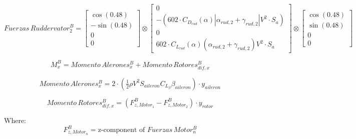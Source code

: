 \documentclass{article}
\begin{document}
\[
  Fuerzas\,Ruddervator_2^B = \begin{bmatrix}
                               \cos(0.48)  \\[6pt]
                               -\sin(0.48) \\[6pt]
                               0           \\[6pt]
                               0
                             \end{bmatrix}
  \otimes \begin{bmatrix}
            0                                                                                           \\[6pt]
            -(602 \cdot C_{D_{rud}}(\alpha)\left| \alpha_{rud,2} + \gamma_{rud,2} \right|V^2 \cdot S_a) \\[6pt]
            0                                                                                           \\[6pt]
            602 \cdot C_{L_{rud}}(\alpha)(\alpha_{rud,2} + \gamma_{rud,2}) V^2 \cdot S_a
          \end{bmatrix}
  \otimes \begin{bmatrix}
            \cos(0.48) \\[6pt]
            \sin(0.48) \\[6pt]
            0          \\[6pt]
            0
          \end{bmatrix}
\]

\[
  M_x^B = Momento\,Alerones_x^B + Momento\,Rotores_{dif,x}^B
\]

\[
  Momento\,Alerones_x^B = 2 \cdot \left( \tfrac{1}{2} \rho V^2 S_{aileron} C_{L_\beta} \beta_{aileron} \right) \cdot y_{aileron}
\]

\[
  Momento\,Rotores_{dif,x}^B = \left( F_{z,Motor_1}^B - F_{z,Motor_2}^B \right) \cdot y_{rotor}
\]

Where:
\[
  F_{z,Motor_n}^B = \text{z-component of } Fuerzas\,Motor_n^B
\]
\end{document}

